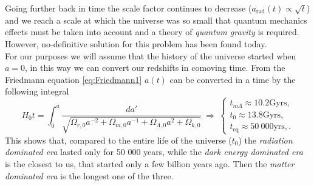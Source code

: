 Going further back in time the scale factor continues to decrease ($a_\text{rad}(t)\propto\sqrt{t}$) and we reach a scale at which the universe was so small that quantum mechanics effects must be taken into account and a theory of \emph{quantum gravity} is required. However, no-definitive solution for this problem has been found today.\\ For our purposes we will assume that the history of the universe started when $a=0$, in this way we can convert our redshifts in comoving time. From the Friedmann equation \eqref{eq:Friedmann1} $a(t)$ can be converted in a time by the following integral$$H_0t=\int_{0}^{a}\frac{da'}{\sqrt{\Omega_{r,0}a^{-2}+\Omega_{m,0}a^{-1}+\Omega_{\Lambda,0}a^{2}+\Omega_{k,0}}}\ \Rightarrow\ \begin{cases}
    t_{m\Lambda}\approx10.2\text{Gyrs},\\
    t_0\approx13.8\text{Gyrs},\\
    t_\text{eq}\approx 50\ 000\text{yrs},.
\end{cases}$$
This shows that, compared to the entire life of the universe ($t_0$) the \emph{radiation dominated era} lasted  only for 50 000 years, while the \emph{dark energy dominated era} is the closest to us, that started only a few billion years ago. Then the \emph{matter dominated era} is the longest one of the three. 




